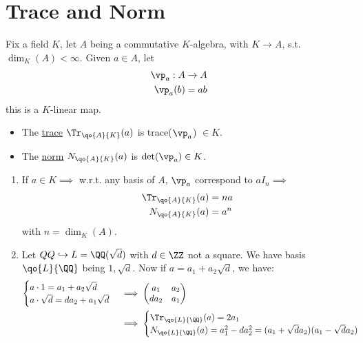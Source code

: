\section{Trace and Norm}

\begin{definition}
	Fix a field \( K \), let \( A \) being a commutative \( K \)-algebra, with \( K \to A \), s.t. \(
	\dim_K(A) < \infty \). Given \( a \in A \), let
	\[
		\begin{aligned}
			\vp_a : A & \to A \\
			\vp_a(b)  & = ab
		\end{aligned}
	\]
	this is a \( K \)-linear map.
	\begin{itemize}
		\item The \underline{trace} \( \Tr_{\qo{A}{K}}(a) \) is trace(\( \vp_a \)) \( \in K \).
		\item The \underline{norm} \( N_{\qo{A}{K}}(a) \) is \( \det(\vp_a) \in K \).
	\end{itemize}
\end{definition}

\begin{eg}
	\leavevmode
	\begin{enumerate}
		\item If \( a \in K \implies \) w.r.t. any basis of \( A \), \( \vp_a \) correspond to \( a I_n
		      \implies \)
		      \[
			      \begin{aligned}
				      \Tr_{\qo{A}{K}}(a) & = na  \\
				      N_{\qo{A}{K}}(a)   & = a^n
			      \end{aligned}
		      \]
		      with \( n = \dim_{K}(A) \).
		\item Let \( QQ \hookrightarrow L = \QQ(\sqrt{d}) \) with \( d \in \ZZ \) not a square. We
		      have basis \( \qo{L}{\QQ} \) being \( 1, \sqrt{d} \). Now if \( a = a_1 + a_2 \sqrt{d} \),
		      we have:
		      \[
			      \begin{aligned}
				      \begin{cases}
					      a\cdot 1 = a_1 + a_2 \sqrt{d} \\
					      a\cdot \sqrt{d} = d a_2 + a_1 \sqrt{d}
				      \end{cases}
				       & \implies
				      \begin{pmatrix}
					      a_1  & a_2 \\
					      da_2 & a_1
				      \end{pmatrix} \\
				       & \implies
				      \begin{cases}
					      \Tr_{\qo{L}{\QQ}}(a) = 2a_1 \\
					      N_{\qo{L}{\QQ}}(a) = a_1^2 -da_2^2 = (a_1 + \sqrt{d}a_2) (a_1 - \sqrt{d}a_2)
				      \end{cases}
			      \end{aligned}
		      \]
	\end{enumerate}
\end{eg}

